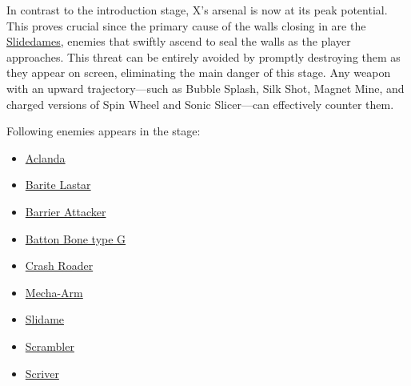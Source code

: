 In contrast to the introduction stage, X's arsenal is now at its peak potential. This proves crucial since the primary cause of the walls closing in are the  \hyperlink{enem:Slidame}{Slidedames}, enemies that swiftly ascend to seal the walls as the player approaches. This threat can be entirely avoided by promptly destroying them as they appear on screen, eliminating the main danger of this stage. Any weapon with an upward trajectory—such as Bubble Splash, Silk Shot, Magnet Mine, and charged versions of Spin Wheel and Sonic Slicer—can effectively counter them.

Following enemies appears in the stage:
\begin{itemize}
	\item \hyperlink{enem:Aclanda}{Aclanda}
	\item \hyperlink{enem:Barite_Lastar}{Barite Lastar}
	\item \hyperlink{enem:Barrier_Attacker}{Barrier Attacker}
	\item \hyperlink{enem:Batton_Bone_type_G}{Batton Bone type G}
	\item \hyperlink{enem:Crash_Roader}{Crash Roader}
	\item \hyperlink{enem:Mecha-Arm}{Mecha-Arm}
	\item \hyperlink{enem:Slidame}{Slidame}
	\item \hyperlink{enem:Scrambler}{Scrambler}
	\item \hyperlink{enem:Scriver}{Scriver}
\end{itemize}

